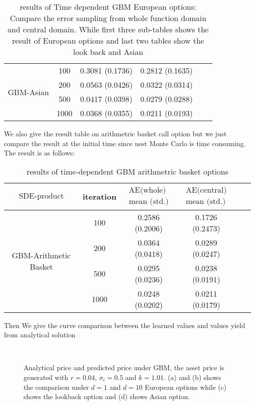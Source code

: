 \documentclass[11pt,a4paper]{article}
\theoremstyle{remark}
\begin{document}
\begin{table}[H]
\begin{tabular}{cccccc}
			\hline \multirow{4}{*}{GBM-Asian} & 100 & 0.3081 (0.1736) & 0.2812 (0.1635) \\
			& 200 & 0.0563 (0.0426) & 0.0322 (0.0314) \\
			& 500 & 0.0417 (0.0398) & 0.0279 (0.0288) \\
			& 1000 & 0.0368 (0.0355) & 0.0211 (0.0193) \\
			
			\hline
		\end{tabular}
		\caption{results of Time dependent GBM European options: Compare the error sampling from whole function domain and central domain. While first three sub-tables shows the result of European options and last two tables show the look back and Asian}
		\label{tab:my_label}
	\end{table}
	We also give the result table on arithmetric basket call option but we just compare the result at the initial time since nest Monte Carlo is time consuming. The result is as follows:
	\begin{table}[H]
		\centering
		\begin{tabular}{cccccc}
			\hline$\text{SDE-product}$ & iteration & $\begin{array}{c}\text{AE(whole)} \\
				\text{mean (std.)} \end{array}$   & $\begin{array}{c}\text{AE(central)} \\
				\text{mean (std.)} \end{array}$  \\
			\hline \multirow{4}{*}{GBM-Arithmetic Basket} & 100 & 0.2586 (0.2006) & 0.1726 (0.2473) \\
			& 200 & 0.0364 (0.0418) & 0.0289 (0.0247) \\
			& 500 & 0.0295 (0.0236)  & 0.0238 (0.0191) \\
			& 1000 & 0.0248 (0.0202) & 0.0211 (0.0179) \\
			
			
			\hline
		\end{tabular}
		
		\caption{results of time-dependent GBM arithmetric basket options}
		\label{tab:my_label}
	\end{table}
	Then We give the curve comparison between the learned values and values yield from analytical solution
	\begin{figure}[H]
		\centering
		\quad
		\\
		\quad
		
		\caption{Analytical price and predicted price under GBM, the asset price is generated with $r = 0.04$, $\sigma_i = 0.5$ and $k = 1.01$. (a) and (b) shows the comparison under $d=1$ and $d=10$ European options while (c) shows the lookback option and (d) shows Asian option.}
		\label{fig:GBM call}
	\end{figure}
\end{document}
